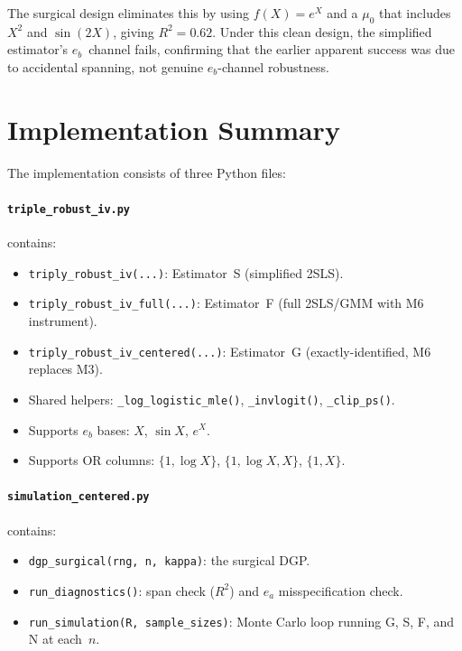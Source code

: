 \documentclass[11pt,letterpaper]{article}
\begin{document}
The surgical design eliminates this by using $f(X) = e^X$ and a
$\mu_0$ that includes $X^2$ and $\sin(2X)$, giving $R^2 = 0.62$.
Under this clean design, the simplified estimator's $e_b$~channel
fails, confirming that the earlier apparent success was due to
accidental spanning, not genuine $e_b$-channel robustness.


\section{Implementation Summary}

The implementation consists of three Python files:

\paragraph{\texttt{triple\_robust\_iv.py}} contains:
\begin{itemize}[nosep]
  \item \texttt{triply\_robust\_iv(...)}: Estimator~S (simplified 2SLS).
  \item \texttt{triply\_robust\_iv\_full(...)}: Estimator~F
    (full 2SLS/GMM with M6 instrument).
  \item \texttt{triply\_robust\_iv\_centered(...)}: Estimator~G
    (exactly-identified, M6 replaces M3).
  \item Shared helpers: \texttt{\_log\_logistic\_mle()},
    \texttt{\_invlogit()}, \texttt{\_clip\_ps()}.
  \item Supports $e_b$ bases: $X$, $\sin X$, $e^X$.
  \item Supports OR columns: $\{1,\log X\}$, $\{1,\log X, X\}$, $\{1, X\}$.
\end{itemize}

\paragraph{\texttt{simulation\_centered.py}} contains:
\begin{itemize}[nosep]
  \item \texttt{dgp\_surgical(rng, n, kappa)}: the surgical DGP.
  \item \texttt{run\_diagnostics()}: span check ($R^2$) and
    $e_a$ misspecification check.
  \item \texttt{run\_simulation(R, sample\_sizes)}: Monte Carlo loop
    running G, S, F, and N at each~$n$.
\end{itemize}
\end{document}
